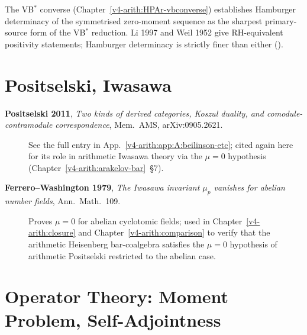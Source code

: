 The VB\(^{*}\) converse
(Chapter~\ref{v4-arith:HPAr-vbconverse}) establishes Hamburger
determinacy of the symmetrised zero-moment sequence as the
sharpest primary-source form of the VB\(^{*}\) reduction. Li 1997
and Weil 1952 give RH-equivalent positivity statements; Hamburger
determinacy is strictly finer than either
().

\section{Positselski, Iwasawa}
\label{v4-arith:app:A:positselski-iwasawa}

\begin{description}
\item[\textbf{Positselski 2011}, \emph{Two kinds of derived categories,
Koszul duality, and comodule-contramodule correspondence},
Mem.~AMS, arXiv:0905.2621.] See the full entry in
App.~\ref{v4-arith:app:A:beilinson-etc}; cited again here for its
role in arithmetic Iwasawa theory via the \(\mu=0\) hypothesis
(Chapter~\ref{v4-arith:arakelov-bar}~\S7).
\item[\textbf{Ferrero--Washington 1979}, \emph{The Iwasawa invariant
\(\mu_{p}\) vanishes for abelian number fields}, Ann.~Math.~109.]
Proves \(\mu=0\) for abelian cyclotomic fields; used in
Chapter~\ref{v4-arith:closure}
 and
Chapter~\ref{v4-arith:comparison}
 to verify that the
arithmetic Heisenberg bar-coalgebra satisfies the \(\mu=0\) hypothesis
of arithmetic Positselski restricted to the abelian case.
\end{description}

\section{Operator Theory: Moment Problem, Self-Adjointness}
\label{v4-arith:app:A:operator-theory}

